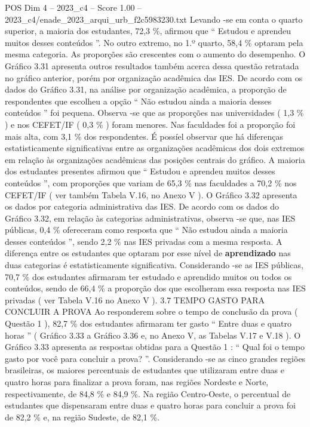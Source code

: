 \begin{textsample}{POS Dim 4 – 2023\_c4 – Score 1.00 – 2023\_c4/enade\_2023\_arqui\_urb\_f2c5983230.txt}
Levando -se em conta o quarto superior, a maioria dos estudantes, 72,3 \%, afirmou que “ Estudou e aprendeu muitos desses conteúdos ”.
No outro extremo, no 1.º quarto, 58,4 \% optaram pela mesma categoria.
As proporções são crescentes com o aumento do desempenho.
O Gráfico 3.31 apresenta outros resultados também acerca dessa questão retratada no gráfico anterior, porém por organização acadêmica das IES.
De acordo com os dados do Gráfico 3.31, na análise por organização acadêmica, a proporção de respondentes que escolheu a opção “ Não estudou ainda a maioria desses conteúdos ” foi pequena.
Observa -se que as proporções nas universidades ( 1,3 \% ) e nos CEFET/IF ( 0,3 \% ) foram menores.
Nas faculdades foi a proporção foi mais alta, com 3,1 \% dos respondentes.
É possíel observar que há diferenças estatisticamente significativas entre as organizações acadêmicas dos dois extremos em relação às organizações acadêmicas das posições centrais do gráfico.
A maioria dos estudantes presentes afirmou que “ Estudou e aprendeu muitos desses conteúdos ”, com proporções que variam de 65,3 \% nas faculdades a 70,2 \% nos CEFET/IF ( ver também Tabela V.16, no Anexo V ).
O Gráfico 3.32 apresenta os dados por categoria administrativa das IES.
De acordo com os dados do Gráfico 3.32, em relação às categorias administrativas, observa -se que, nas IES públicas, 0,4 \% ofereceram como resposta que “ Não estudou ainda a maioria desses conteúdos ”, sendo 2,2 \% nas IES privadas com a mesma resposta.
A diferença entre os estudantes que optaram por esse nível de \textbf{aprendizado} nas duas categorias é estatisticamente significativa.
Considerando -se as IES públicas, 70,7 \% dos estudantes afirmaram ter estudado e aprendido muitos ou todos os conteúdos, sendo de 66,4 \% a proporção dos que escolheram essa resposta nas IES privadas ( ver Tabela V.16 no Anexo V ). 3.7 TEMPO GASTO PARA CONCLUIR A PROVA Ao responderem sobre o tempo de conclusão da prova ( Questão 1 ), 82,7 \% dos estudantes afirmaram ter gasto “ Entre duas e quatro horas ” ( Gráfico 3.33 a Gráfico 3.36 e, no Anexo V, as Tabelas V.17 e V.18 ).
O Gráfico 3.33 apresenta as respostas obtidas para a Questão 1 : “ Qual foi o tempo gasto por você para concluir a prova? ”.
Considerando -se as cinco grandes regiões brasileiras, os maiores percentuais de estudantes que utilizaram entre duas e quatro horas para finalizar a prova foram, nas regiões Nordeste e Norte, respectivamente, de 84,8 \% e 84,9 \%.
Na região Centro-Oeste, o percentual de estudantes que dispensaram entre duas e quatro horas para concluir a prova foi de 82,2 \% e, na região Sudeste, de 82,1 \%.

\end{textsample}
